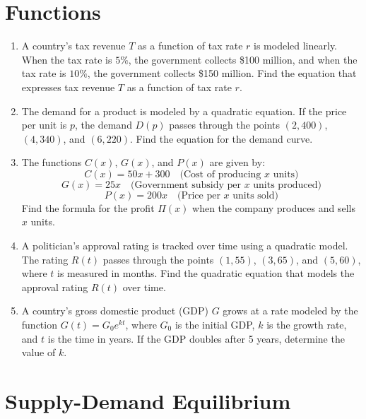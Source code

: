 \documentclass{article}
\begin{document}
\section{Functions}

\begin{enumerate}[leftmargin = 0.5cm, label = \arabic*., rightmargin = 0.2cm]

    \item A country's tax revenue \(T\) as a function of tax rate \(r\) is modeled linearly. When the tax rate is $5\%$, the government collects \$100 million, and when the tax rate is $10\%$, the government collects \$150 million. Find the equation that expresses tax revenue \(T\) as a function of tax rate \(r\).
    
    \item The demand for a product is modeled by a quadratic equation. If the price per unit is \(p\), the demand \(D(p)\) passes through the points $(2, 400)$, $(4, 340)$, and $(6, 220)$. Find the equation for the demand curve.

    \item The functions \( C(x) \), \( G(x) \), and \( P(x) \) are given by:
    \[
    C(x) = 50x + 300 \quad \text{(Cost of producing $x$ units)}
    \]
    \[
    G(x) = 25x \quad \text{(Government subsidy per $x$ units produced)}
    \]
    \[
    P(x) = 200x \quad \text{(Price per $x$ units sold)}
    \]
    Find the formula for the profit \( \Pi(x) \) when the company produces and sells \( x \) units.

    \item A politician’s approval rating is tracked over time using a quadratic model. The rating \( R(t) \) passes through the points \( (1, 55) \), \( (3, 65) \), and \( (5, 60) \), where \(t\) is measured in months. Find the quadratic equation that models the approval rating \( R(t) \) over time.

    \item A country’s gross domestic product (GDP) \(G\) grows at a rate modeled by the function \( G(t) = G_0 e^{kt} \), where \( G_0 \) is the initial GDP, \( k \) is the growth rate, and \( t \) is the time in years. If the GDP doubles after 5 years, determine the value of \(k\).

\end{enumerate}

\section{Supply-Demand Equilibrium}
\end{document}
